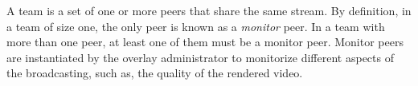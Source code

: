 
\label{sec:team_def}

A team is a set of one or more peers that share the same stream. By
definition, in a team of size one, the only peer is known as a
\emph{monitor} peer. In a team with more than one peer, at least one
of them must be a monitor peer. Monitor peers are instantiated by the
overlay administrator to monitorize different aspects of the
broadcasting, such as, the quality of the rendered video.
